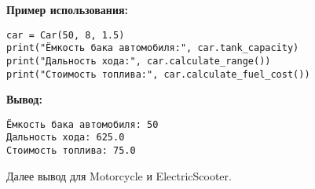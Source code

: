 \begin{enumerate}
\textbf{Пример использования:}
\begin{verbatim}
car = Car(50, 8, 1.5)
print("Ёмкость бака автомобиля:", car.tank_capacity)
print("Дальность хода:", car.calculate_range())
print("Стоимость топлива:", car.calculate_fuel_cost())
\end{verbatim}

\textbf{Вывод:}
\begin{verbatim}
Ёмкость бака автомобиля: 50
Дальность хода: 625.0
Стоимость топлива: 75.0
\end{verbatim}

Далее вывод для Motorcycle и ElectricScooter.



\end{enumerate}